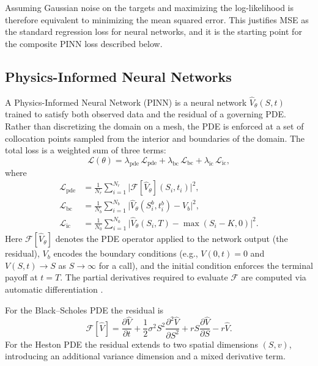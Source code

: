 Assuming Gaussian noise on the targets and maximizing the log-likelihood is therefore equivalent to minimizing the mean squared error. This justifies MSE as the standard regression loss for neural networks, and it is the starting point for the composite PINN loss described below.

\subsection{Physics-Informed Neural Networks}\label{subsection:pinn}

A Physics-Informed Neural Network (PINN) is a neural network $\hat{V}_\theta(S, t)$ trained to satisfy both observed data and the residual of a governing PDE. Rather than discretizing the domain on a mesh, the PDE is enforced at a set of collocation points sampled from the interior and boundaries of the domain. The total loss is a weighted sum of three terms:
\begin{equation}\label{eq:pinn_loss}
    \mathcal{L}(\theta)
    = \lambda_\text{pde}\,\mathcal{L}_\text{pde}
    + \lambda_\text{bc}\,\mathcal{L}_\text{bc}
    + \lambda_\text{ic}\,\mathcal{L}_\text{ic},
\end{equation}
where
\begin{align}
    \mathcal{L}_\text{pde} &= \frac{1}{N_r}\sum_{i=1}^{N_r}\bigl|\mathcal{F}[\hat{V}_\theta](S_i,t_i)\bigr|^2, \\
    \mathcal{L}_\text{bc}  &= \frac{1}{N_b}\sum_{i=1}^{N_b}\bigl|\hat{V}_\theta(S_i^b,t_i^b) - V_b\bigr|^2, \\
    \mathcal{L}_\text{ic}  &= \frac{1}{N_0}\sum_{i=1}^{N_0}\bigl|\hat{V}_\theta(S_i,T) - \max(S_i-K,0)\bigr|^2.
\end{align}
Here $\mathcal{F}[\hat{V}_\theta]$ denotes the PDE operator applied to the network output (the residual), $V_b$ encodes the boundary conditions (e.g., $V(0,t)=0$ and $V(S,t)\to S$ as $S\to\infty$ for a call), and the initial condition enforces the terminal payoff at $t=T$. The partial derivatives required to evaluate $\mathcal{F}$ are computed via automatic differentiation \parencite{goodfellow2016deep}.

For the Black--Scholes PDE the residual is
\[
    \mathcal{F}[\hat{V}]
    = \frac{\partial \hat{V}}{\partial t}
    + \frac{1}{2}\sigma^2 S^2 \frac{\partial^2 \hat{V}}{\partial S^2}
    + rS\frac{\partial \hat{V}}{\partial S}
    - r\hat{V}.
\]
For the Heston PDE the residual extends to two spatial dimensions $(S, v)$, introducing an additional variance dimension and a mixed derivative term.

